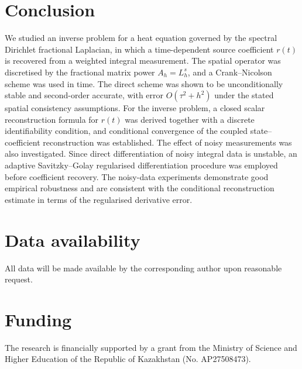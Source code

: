 \documentclass[reqno]{amsart}
\begin{document}
\section{Conclusion}
We studied an inverse problem for a heat equation governed by the spectral Dirichlet fractional Laplacian, in which a time-dependent source coefficient $r(t)$ is recovered from a weighted integral measurement. The spatial operator was discretised by the fractional matrix power $A_h=L_h^s$, and a Crank--Nicolson scheme was used in time. The direct scheme was shown to be unconditionally stable and second-order accurate, with error $O(\tau^2+h^2)$ under the stated spatial consistency assumptions. For the inverse problem, a closed scalar reconstruction formula for $r(t)$ was derived together with a discrete identifiability condition, and conditional convergence of the coupled state--coefficient reconstruction was established. The effect of noisy measurements was also investigated. Since direct differentiation of noisy integral data is unstable, an adaptive Savitzky--Golay regularised differentiation procedure was employed before coefficient recovery.  The noisy-data experiments demonstrate good empirical robustness and
are consistent with the conditional reconstruction estimate in terms of the regularised derivative error.

\section*{Data availability}
All data will be made available by the corresponding author upon reasonable request.

\section*{Funding}
\noindent
The research is financially supported by a grant from the Ministry of Science and Higher Education of the Republic of Kazakhstan (No. AP27508473).
\end{document}
